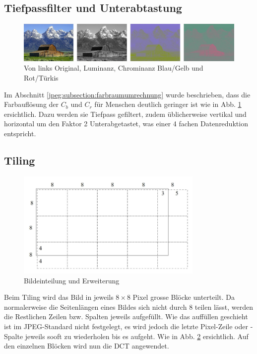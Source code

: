 \subsection{Tiefpassfilter und Unterabtastung
\label{jpeg:subsection:tiefpass}}

\begin{figure}
    \centering
    \includegraphics[width=\linewidth]{papers/jpeg/pictures/ycbcr.pdf}
    \caption{Von links Original, Luminanz, Chrominanz Blau/Gelb und Rot/Türkis
        \label{jpeg:fig:ycbcr}}
\end{figure}

Im Abschnitt \ref{jpeg:subsection:farbraumumrechnung} wurde beschrieben, dass die Farbauflösung der \(C_b\) und \(C_r\) für Menschen deutlich geringer ist wie in Abb. \ref{jpeg:fig:ycbcr} ersichtlich.
Dazu werden sie Tiefpass gefiltert, zudem üblicherweise vertikal und horizontal um den Faktor 2 Unterabgetastet, was einer 4 fachen Datenreduktion entspricht.

\subsection{Tiling
\label{jpeg:subsection:tiling}}

\begin{figure}
    \centering
    \includegraphics[width=90mm]{papers/jpeg/pictures/unterteilung.pdf}
    \caption{Bildeinteilung und Erweiterung
        \label{jpeg:fig:tiling}}
\end{figure}

Beim Tiling wird das Bild in jeweils \(8\times8\) Pixel grosse Blöcke unterteilt.
Da normalerweise die Seitenlängen eines Bildes sich nicht durch 8 teilen lässt, werden die Restlichen Zeilen bzw. Spalten jeweils aufgefüllt.
Wie das auffüllen geschieht ist im JPEG-Standard nicht festgelegt, es wird jedoch die letzte Pixel-Zeile oder -Spalte jeweils sooft zu wiederholen bis es aufgeht.
Wie in Abb. \ref{jpeg:fig:tiling} ersichtlich.
Auf den einzelnen Blöcken wird nun die DCT angewendet.

